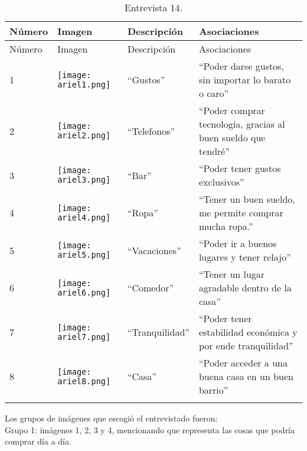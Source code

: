 \begin{longtable}{>{\centering\arraybackslash}m{1cm} >{\centering\arraybackslash}m{2cm} >{\arraybackslash}m{5cm}>{\arraybackslash}m{5cm}}
	
	\hline
	Número & Imagen & Descripción & Asociaciones \\
	\hline \hline
	\endfirsthead
	
	\hline
	Número & Imagen & Descripción & Asociaciones \\
	\hline \hline
	\endhead

1 & \texttt{[image: ariel1.png]} & ``Gustos'' & ``Poder darse gustos, sin importar lo barato o caro'' \\
\hline

2 & \texttt{[image: ariel2.png]} & ``Telefonos'' & ``Poder comprar tecnología, gracias al buen sueldo que tendré'' \\
\hline

3 & \texttt{[image: ariel3.png]} & ``Bar'' & ``Poder tener gustos exclusivos'' \\
\hline

4 & \texttt{[image: ariel4.png]} & ``Ropa'' & ``Tener un buen sueldo, me permite comprar mucha ropa.'' \\
\hline

5 & \texttt{[image: ariel5.png]} & ``Vacaciones'' & ``Poder ir a buenos lugares y tener relajo'' \\
\hline

6 & \texttt{[image: ariel6.png]} & ``Comedor'' & ``Tener un lugar agradable dentro de la casa'' \\
\hline

7 & \texttt{[image: ariel7.png]} & ``Tranquilidad'' & ``Poder tener estabilidad económica y por ende tranquilidad'' \\
\hline

8 & \texttt{[image: ariel8.png]} & ``Casa'' & ``Poder acceder a una buena casa en un buen barrio'' \\
\hline


\caption{Entrevista 14.}
\label{tabla:ariel}
\end{longtable}

Los grupos de imágenes que escogió el entrevistado fueron:\\

Grupo 1: imágenes 1, 2, 3 y 4, mencionando que representa las cosas que podría comprar día a día.\\

